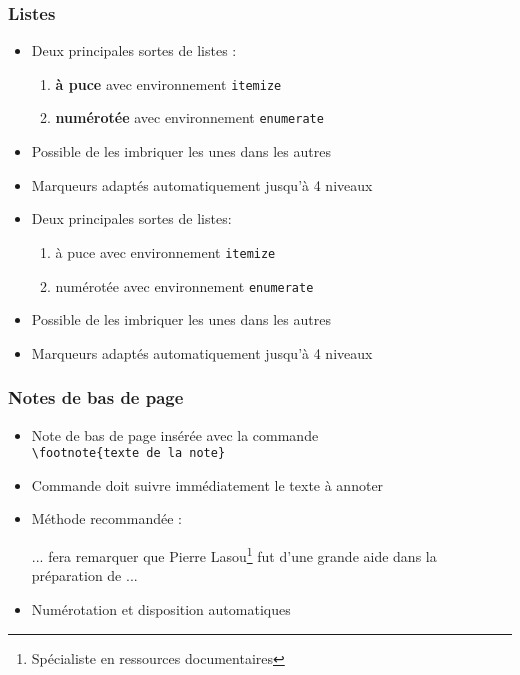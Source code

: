
\begin{frame}[fragile]

	\frametitle{Listes}
	
	\begin{itemize}
		\item Deux principales sortes de listes :
		\begin{enumerate}
			\item \textbf{à puce} avec environnement \texttt{itemize}
			\item \textbf{numérotée} avec environnement \texttt{enumerate}
		\end{enumerate}
		\item Possible de les imbriquer les unes dans les autres
		\item Marqueurs adaptés automatiquement jusqu'à 4 niveaux
	\end{itemize}

	\pause
	
	\begin{codesource}
	\begin{itemize}
		\item Deux principales sortes de listes:
		\begin{enumerate}
			\item à puce avec environnement \verb=itemize=
			\item numérotée avec environnement \verb=enumerate=
		\end{enumerate}
		\item Possible de les imbriquer les unes
			dans les autres
		\item Marqueurs adaptés automatiquement jusqu'à 4 niveaux
	\end{itemize}
	\end{codesource}

\end{frame}


\begin{frame}[fragile]

	\frametitle{Notes de bas de page}
	
	\begin{itemize}
		\item Note de bas de page insérée avec la commande \\
			\lstinline|\footnote{texte de la note}|
			
		\item Commande doit suivre immédiatement le texte à annoter
		
		\item Méthode recommandée : 
		\begin{codesource}
	... fera remarquer que Pierre Lasou\footnote{%
	Spécialiste en ressources documentaires} %
	fut d'une grande aide dans la préparation de ...
		\end{codesource}
				
		\item Numérotation et disposition automatiques
	\end{itemize}
\end{frame}

